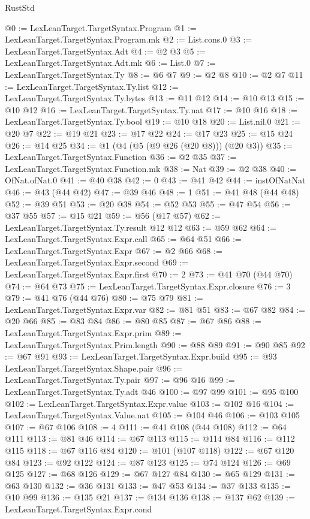 \begin{lexlean}{RustStd}
\begin{coremodule}
{\begin{coremodule}
{{{{{{{{{{{{{{{{{{{{{{{{{{@0 := LexLeanTarget.TargetSyntax.Program
@1 := LexLeanTarget.TargetSyntax.Program.mk
@2 := List.cons.{0}
@3 := LexLeanTarget.TargetSyntax.Adt
@4 := @2 @3
@5 := LexLeanTarget.TargetSyntax.Adt.mk
@6 := List.{0}
@7 := LexLeanTarget.TargetSyntax.Ty
@8 := @6 @7
@9 := @2 @8
@10 := @2 @7
@11 := LexLeanTarget.TargetSyntax.Ty.list
@12 := LexLeanTarget.TargetSyntax.Ty.bytes
@13 := @11 @12
@14 := @10 @13
@15 := @10 @12
@16 := LexLeanTarget.TargetSyntax.Ty.nat
@17 := @10 @16
@18 := LexLeanTarget.TargetSyntax.Ty.bool
@19 := @10 @18
@20 := List.nil.{0}
@21 := @20 @7
@22 := @19 @21
@23 := @17 @22
@24 := @17 @23
@25 := @15 @24
@26 := @14 @25
@34 := @1 (@4 (@5 (@9 @26 (@20 @8))) (@20 @3))
@35 := LexLeanTarget.TargetSyntax.Function
@36 := @2 @35
@37 := LexLeanTarget.TargetSyntax.Function.mk
@38 := Nat
@39 := @2 @38
@40 := OfNat.ofNat.{0}
@41 := @40 @38
@42 := 0
@43 := @41 @42
@44 := instOfNatNat
@46 := @43 (@44 @42)
@47 := @39 @46
@48 := 1
@51 := @41 @48 (@44 @48)
@52 := @39 @51
@53 := @20 @38
@54 := @52 @53
@55 := @47 @54
@56 := @37 @55
@57 := @15 @21
@59 := @56 (@17 @57)
@62 := LexLeanTarget.TargetSyntax.Ty.result @12 @12
@63 := @59 @62
@64 := LexLeanTarget.TargetSyntax.Expr.call
@65 := @64 @51
@66 := LexLeanTarget.TargetSyntax.Expr
@67 := @2 @66
@68 := LexLeanTarget.TargetSyntax.Expr.second
@69 := LexLeanTarget.TargetSyntax.Expr.first
@70 := 2
@73 := @41 @70 (@44 @70)
@74 := @64 @73
@75 := LexLeanTarget.TargetSyntax.Expr.closure
@76 := 3
@79 := @41 @76 (@44 @76)
@80 := @75 @79
@81 := LexLeanTarget.TargetSyntax.Expr.var
@82 := @81 @51
@83 := @67 @82
@84 := @20 @66
@85 := @83 @84
@86 := @80 @85
@87 := @67 @86
@88 := LexLeanTarget.TargetSyntax.Expr.prim
@89 := LexLeanTarget.TargetSyntax.Prim.length
@90 := @88 @89
@91 := @90 @85
@92 := @67 @91
@93 := LexLeanTarget.TargetSyntax.Expr.build
@95 := @93 LexLeanTarget.TargetSyntax.Shape.pair
@96 := LexLeanTarget.TargetSyntax.Ty.pair
@97 := @96 @16
@99 := LexLeanTarget.TargetSyntax.Ty.adt @46
@100 := @97 @99
@101 := @95 @100
@102 := LexLeanTarget.TargetSyntax.Expr.value
@103 := @102 @16
@104 := LexLeanTarget.TargetSyntax.Value.nat
@105 := @104 @46
@106 := @103 @105
@107 := @67 @106
@108 := 4
@111 := @41 @108 (@44 @108)
@112 := @64 @111
@113 := @81 @46
@114 := @67 @113
@115 := @114 @84
@116 := @112 @115
@118 := @67 @116 @84
@120 := @101 (@107 @118)
@122 := @67 @120 @84
@123 := @92 @122
@124 := @87 @123
@125 := @74 @124
@126 := @69 @125
@127 := @68 @126
@129 := @67 @127 @84
@130 := @65 @129
@131 := @63 @130
@132 := @36 @131
@133 := @47 @53
@134 := @37 @133
@135 := @10 @99
@136 := @135 @21
@137 := @134 @136
@138 := @137 @62
@139 := LexLeanTarget.TargetSyntax.Expr.cond
}}}}}}}}}}}}}}}}}}}}}}}}}}
\end{coremodule}}
\end{coremodule}
\end{lexlean}
